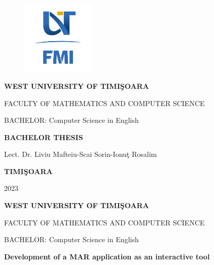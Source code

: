 \documentclass[12pt,a4paper]{book}
\theoremstyle{definition}
\theoremstyle{remark}
\begin{document}
\sloppy

\thispagestyle{empty}

\begin{center}
    \begin{figure}[h!]
        \vspace{-20pt}
        \begin{center}
            \includegraphics[width=100pt]{img/FMI-03.png}
        \end{center}
    \end{figure}


    {\large{\bf WEST UNIVERSITY OF TIMI\c SOARA

        FACULTY OF MATHEMATICS AND COMPUTER SCIENCE
 
        BACHELOR:  Computer Science in English}}

    \vspace{120pt}
    {\huge {\bf BACHELOR THESIS}}

    \vspace{160pt}
\end{center}

{\large{}

\noindent Lect. Dr. Liviu Mafteiu-Scai\hfill
\noindent Sorin-Ionu\c t Rosalim
}

\vfill
\begin{center}
    {\bf TIMI\c SOARA

        2023}
\end{center}
\newpage
\thispagestyle{empty}
\begin{center}
    {\large{\bf WEST UNIVERSITY OF TIMI\c SOARA

            FACULTY OF MATHEMATICS AND COMPUTER SCIENCE

            BACHELOR:  Computer Science in English}}

    \vspace{200pt}
    {\huge {\bf Development of a \ac{MAR} application as an interactive tool}}

    \vspace{153pt}
\end{center}
\end{document}
